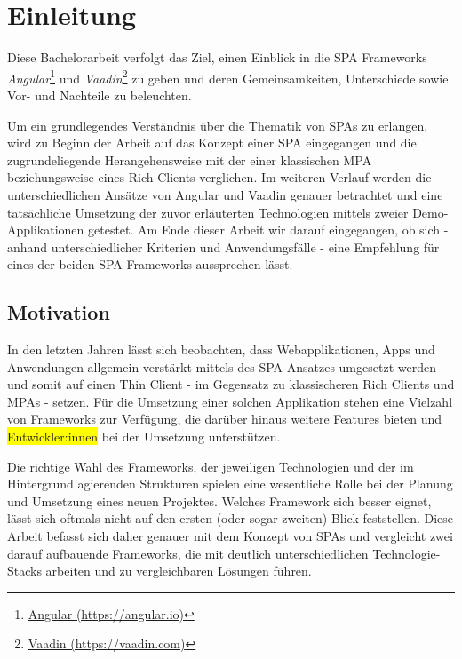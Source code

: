 \documentclass[a4paper,12pt,twoside]{scrreprt}
\begin{document}
\chapter{Einleitung}
\label{chap:einleitung}
Diese Bachelorarbeit verfolgt das Ziel, einen Einblick in die \ac{SPA} Frameworks \textit{Angular}\footnote{\href{https://angular.io/}{Angular (https://angular.io)}} und \textit{Vaadin}\footnote{\href{https://vaadin.com/}{Vaadin (https://vaadin.com)}} zu geben und deren Gemeinsamkeiten, Unterschiede sowie Vor- und Nachteile zu beleuchten.

\medskip

Um ein grundlegendes Verständnis über die Thematik von \aclp{SPA} zu erlangen, wird zu Beginn der Arbeit auf das Konzept einer \ac{SPA} eingegangen und die zugrundeliegende Herangehensweise mit der einer klassischen \ac{MPA} beziehungsweise eines Rich Clients verglichen. Im weiteren Verlauf werden die unterschiedlichen Ansätze von Angular und Vaadin genauer betrachtet und eine tatsächliche Umsetzung der zuvor erläuterten Technologien mittels zweier Demo-Applikationen getestet. Am Ende dieser Arbeit wir darauf eingegangen, ob sich - anhand unterschiedlicher Kriterien und Anwendungsfälle - eine Empfehlung für eines der beiden \acs{SPA} Frameworks aussprechen lässt.

\section{Motivation}
\label{sec:motivation}
In den letzten Jahren lässt sich beobachten, dass Webapplikationen, Apps und Anwendungen allgemein verstärkt mittels des \acs{SPA}-Ansatzes umgesetzt werden und somit auf einen Thin Client - im Gegensatz zu klassischeren Rich Clients und \aclp{MPA} - setzen. Für die Umsetzung einer solchen Applikation stehen eine Vielzahl von Frameworks zur Verfügung, die darüber hinaus weitere Features bieten und \colorbox{yellow}{Entwickler:innen} bei der Umsetzung unterstützen.

\newpage

Die richtige Wahl des Frameworks, der jeweiligen Technologien und der im Hintergrund agierenden Strukturen spielen eine wesentliche Rolle bei der Planung und Umsetzung eines neuen Projektes. Welches Framework sich besser eignet, lässt sich oftmals nicht auf den ersten (oder sogar zweiten) Blick feststellen. Diese Arbeit befasst sich daher genauer mit dem Konzept von \aclp{SPA} und vergleicht zwei darauf aufbauende Frameworks, die mit deutlich unterschiedlichen Technologie-Stacks arbeiten und zu vergleichbaren Lösungen führen.
\end{document}
